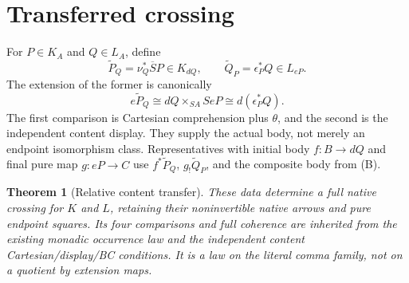 \documentclass[11pt]{article}
\newtheorem{theorem}{Theorem}
\begin{document}
\section{Transferred crossing}
For $P\in K_A$ and $Q\in L_A$, define
\[
 \widetilde P_Q=\nu_Q^*\overline SP\in K_{dQ},\qquad
 \widetilde Q_P=\epsilon_P^*Q\in L_{eP}.
\tag{T}
\]
The extension of the former is canonically
\[
 e\widetilde P_Q\cong dQ\times_{SA}SeP
                  \cong d(\epsilon_P^*Q).
\tag{B}
\]
The first comparison is Cartesian comprehension plus $\theta$, and the second is the independent content display. They supply the actual body, not merely an endpoint isomorphism class. Representatives with initial body $f:B\to dQ$ and final pure map $g:eP\to C$ use $f^*\widetilde P_Q$, $g_!\widetilde Q_P$, and the composite body from (B).

\begin{theorem}[Relative content transfer]
These data determine a full native crossing for $K$ and $L$, retaining their noninvertible native arrows and pure endpoint squares. Its four comparisons and full coherence are inherited from the existing monadic occurrence law and the independent content Cartesian/display/BC conditions. It is a law on the literal comma family, not on a quotient by extension maps.
\end{theorem}
\end{document}
